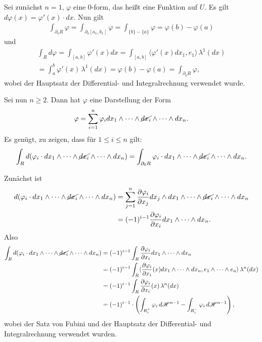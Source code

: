 \documentclass[a4paper,twoside,DIV15,BCOR12mm]{scrbook}
\newcommand{\HM}{\mathscr H}
\begin{document}
\begin{beweis}
Sei zunächst $n=1$, $\varphi$ eine 0-form, das heißt eine Funktion auf $U$. Es gilt $d\varphi(x) = \varphi'(x)\cdot dx$. Nun gilt
\begin{align*}
\int_{\partial_o R}\varphi = \int_{\partial_o [a_1,b_1]}\varphi = 
\int_{\{b\}-\{a\}} \varphi = \varphi(b)-\varphi(a)
\end{align*}
und
\begin{multline*}
\int_R d\varphi = \int_{[a,b]} \varphi'(x)dx = \int_{[a,b]}\langle \varphi'(x)dx_1, e_1\rangle \, \lambda^1(dx) \\
= \int_a^b \varphi'(x) \,\lambda^1(dx) = \varphi(b)-\varphi(a) = \int_{\partial_oR}\varphi,
\end{multline*}
wobei der Hauptsatz der Differential- und Integralrechnung verwendet wurde. 

Sei nun $n\ge 2$. Dann hat $\varphi$ eine Darstellung der Form
\[
\varphi = \sum_{i=1}^n \varphi_i dx_1\wedge \dots \wedge \cancel{dx_i}\wedge \dots\wedge dx_n.
\]
Es genügt, zu zeigen, dass für $1\le i \le n$ gilt:
\[
\int_R d(\varphi_i \cdot dx_1\wedge \dots \wedge \cancel{dx_i} \wedge \dots\wedge dx_n) = 
\int_{\partial_0 R} \varphi_i \cdot dx_1\wedge \dots \wedge \cancel{dx_i} \wedge \dots\wedge dx_n.
\]

Zunächst ist 
\begin{align*}
d(\varphi_i \cdot dx_1\wedge \dots \wedge \cancel{dx_i} \wedge \dots\wedge dx_n)
&= \sum_{j=1}^n \frac{\partial \varphi_i}{\partial x_j} dx_j \wedge dx_1\wedge \dots \wedge \cancel{dx_i} \wedge \dots\wedge dx_n \\
&= (-1)^{i-1} \frac{\partial \varphi_i}{\partial x_i} dx_1\wedge \dots\wedge dx_n.
\end{align*}
Also
\begin{align*}
\int_R d(\varphi_i \cdot dx_1\wedge \dots \wedge \cancel{dx_i} \wedge \dots\wedge dx_n)
&= (-1)^{i-1} \int_R \frac{\partial \varphi_i}{\partial x_i} dx_1\wedge \dots\wedge dx_n \\
&= (-1)^{i-1} \int_R \langle \frac{\partial \varphi_i}{\partial x_i}(x) dx_1\wedge \dots\wedge dx_n, e_1\wedge\dots\wedge e_n\rangle \, \lambda^n(dx) \\
&= (-1)^{i-1} \int_R \frac{\partial \varphi_i}{\partial x_i}(x)\, \lambda^n(dx) \\
&= (-1)^{i-1} \cdot \left(\int_{R_i^+} \varphi_i\, d\HM^{n-1} - \int_{R_i^-} \varphi_i\, d\HM^{n-1}\right),
\end{align*}
wobei der Satz von Fubini und der Hauptsatz der Differential- und Integralrechnung verwendet wurden. 


\end{beweis}
\end{document}
